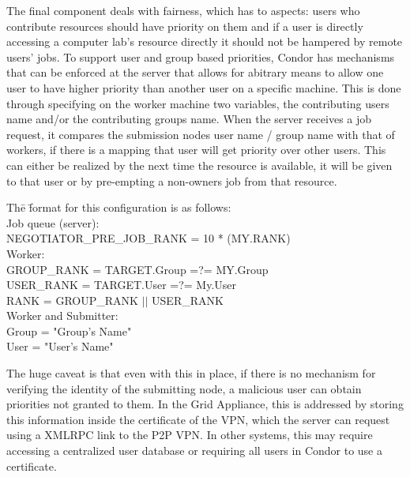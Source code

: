 \documentclass[conference]{IEEEtran}
\begin{document}
The final component deals with fairness, which has to aspects:  users who
contribute resources should have priority on them and if a user is directly
accessing a computer lab's resource directly it should not be hampered by
remote users' jobs.  To support user and group based priorities, Condor has
mechanisms that can be enforced at the server that allows for abitrary means to
allow one user to have higher priority than another user on a specific machine.
This is done through specifying on the worker machine two variables, the
contributing users name and/or the contributing groups name.  When the server
receives a job request, it compares the submission nodes user name / group name
with that of workers, if there is a mapping that user will get priority over
other users.  This can either be realized by the next time the resource is
available, it will be given to that user or by pre-empting a non-owners job
from that resource.

\begin{tabbing}
Th\=e \=format for this configuration is as follows:\\
\> Job queue (server):\\
\> \> NEGOTIATOR\_PRE\_JOB\_RANK = 10 * (MY.RANK) \\
\> Worker:\\
\> \> GROUP\_RANK = TARGET.Group =?= MY.Group \\
\> \> USER\_RANK = TARGET.User =?= My.User \\
\> \> RANK = GROUP\_RANK $\vert\vert$ USER\_RANK \\
\>  Worker and Submitter:\\
\> \> Group = "Group's Name"\\
\> \> User = "User's Name"
\end{tabbing}

The huge caveat is that even with this in place, if there is no mechanism for
verifying the identity of the submitting node, a malicious user can obtain
priorities not granted to them.  In the Grid Appliance, this is addressed by
storing this information inside the certificate of the VPN, which the server
can request using a XMLRPC link to the P2P VPN.  In other systems, this may
require accessing a centralized user database or requiring all users in Condor
to use a certificate.
\end{document}
